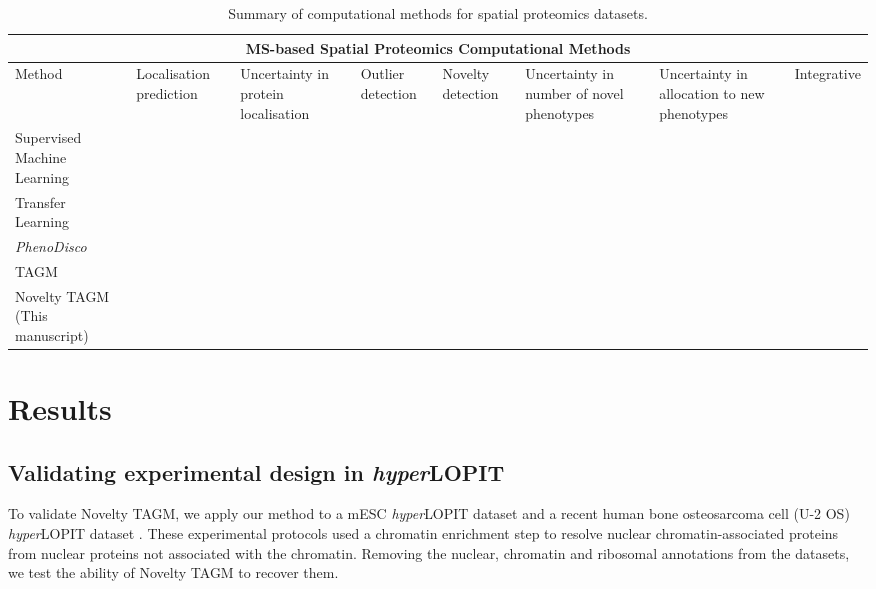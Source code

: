 \documentclass[12pt,english]{article}
\newcommand{\xmark}{\ding{55}}
\begin{document}
\begin{table}[h]
	\centering
	\footnotesize
	\hspace*{-1.5cm}
	\begin{tabular}{ |p{2.5cm}|p{2cm}|p{2cm}|p{1.5cm}|p{2cm}|p{2cm}|p{2cm}|p{2cm}|  }
		\hline
		\multicolumn{8}{|c|}{MS-based Spatial Proteomics Computational Methods} \\
		\hline
		 Method & Localisation prediction & Uncertainty in protein localisation & Outlier detection  & Novelty detection & Uncertainty in number of novel phenotypes & Uncertainty in allocation to new phenotypes & Integrative \\
		\hline
		\hline
		Supervised Machine Learning\citep{Gatto:2014b}  & \vfill\hfil \checkmark & \vfill\hfil\xmark & \vfill\hfil\xmark &\vfill\hfil\xmark&\vfill\hfil\xmark&\vfill\hfil\xmark& \vfill\hfil\xmark\\
		\hline
		Transfer Learning \citep{Breckels:2016}  & \vfill\hfil \checkmark  & \vfill\hfil\xmark& \vfill\hfil\xmark &\vfill\hfil\xmark&\vfill\hfil\xmark& \vfill\hfil\xmark&\vfill\hfil \checkmark\\
		\hline
		\textit{PhenoDisco} \citep{Breckels:2013}  & \vfill\hfil\xmark &\vfill\hfil\xmark &\vfill\hfil \checkmark &\vfill\hfil \checkmark&\vfill\hfil\xmark&\vfill\hfil\xmark& \vfill\hfil\xmark\\
		\hline
		TAGM \citep{Crook:2018}& \vfill\hfil \checkmark & \vfill\hfil \checkmark & \vfill\hfil \checkmark& \vfill\hfil\xmark&\vfill\hfil\xmark&\vfill\hfil\xmark&\vfill\hfil\xmark\\
		\hline
		Novelty TAGM (This manuscript)&  \vfill\hfil \checkmark & \vfill\hfil \checkmark &\vfill\hfil \checkmark & \vfill\hfil \checkmark&\vfill\hfil \checkmark&\vfill\hfil \checkmark& \vfill\hfil\xmark\\
		\hline
		\hline
	\end{tabular}
	\caption{Summary of computational methods for spatial  proteomics datasets.}
	\label{table:methods}
\end{table}
\clearpage
\section{Results}
\subsection{Validating experimental design in \textit{hyper}LOPIT}
To validate Novelty TAGM, we apply our method to a mESC \textit{hyper}LOPIT dataset \citep{hyper} and a recent human bone osteosarcoma cell (U-2 OS) \textit{hyper}LOPIT dataset \citep{Thul:2017, DC:2018}. These experimental protocols used a chromatin enrichment step to resolve nuclear chromatin-associated proteins from nuclear proteins not associated with the chromatin. Removing the nuclear, chromatin and ribosomal annotations from the datasets, we test the ability of Novelty TAGM to recover them.
\end{document}
